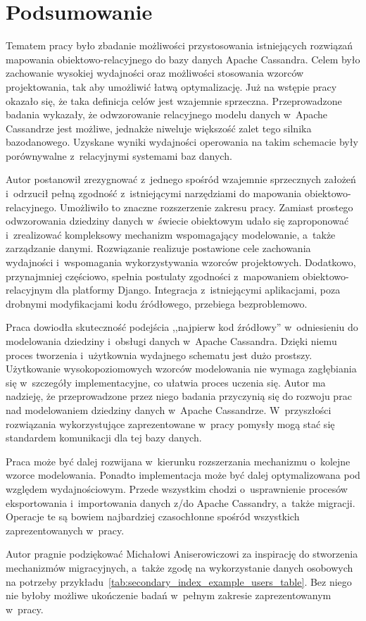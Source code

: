 
\chapter{Podsumowanie}
\label{chap:summary}

Tematem pracy było zbadanie możliwości przystosowania istniejących rozwiązań mapowania obiektowo-relacyjnego do bazy danych Apache Cassandra. Celem było zachowanie wysokiej wydajności oraz możliwości stosowania wzorców projektowania, tak aby umożliwić łatwą optymalizację. Już na wstępie pracy okazało się, że taka definicja celów jest wzajemnie sprzeczna. Przeprowadzone badania wykazały, że odwzorowanie relacyjnego modelu danych w~Apache Cassandrze jest możliwe, jednakże niweluje większość zalet tego silnika bazodanowego. Uzyskane wyniki wydajności operowania na takim schemacie były porównywalne z~relacyjnymi systemami baz danych.

Autor postanowił zrezygnować z~jednego spośród wzajemnie sprzecznych założeń i~odrzucił pełną zgodność z~istniejącymi narzędziami do mapowania obiektowo-relacyjnego. Umożliwiło to znaczne rozszerzenie zakresu pracy. Zamiast prostego odwzorowania dziedziny danych w~świecie obiektowym udało się zaproponować i~zrealizować kompleksowy mechanizm wspomagający modelowanie, a~także zarządzanie danymi. Rozwiązanie realizuje postawione cele zachowania wydajności i~wspomagania wykorzystywania wzorców projektowych. Dodatkowo, przynajmniej częściowo, spełnia postulaty zgodności z~mapowaniem obiektowo-relacyjnym dla platformy Django. Integracja z~istniejącymi aplikacjami, poza drobnymi modyfikacjami kodu źródłowego, przebiega bezproblemowo.

Praca dowiodła skuteczność podejścia ,,najpierw kod źródłowy'' w~odniesieniu do modelowania dziedziny i~obsługi danych w~Apache Cassandra. Dzięki niemu proces tworzenia i~użytkownia wydajnego schematu jest dużo prostszy. Użytkowanie wysokopoziomowych wzorców modelowania nie wymaga zagłębiania się w~szczegóły implementacyjne, co ułatwia proces uczenia się. Autor ma nadzieję, że przeprowadzone przez niego badania przyczynią się do rozwoju prac nad modelowaniem dziedziny danych w~Apache Cassandrze. W~przyszłości rozwiązania wykorzystujące zaprezentowane w~pracy pomysły mogą stać się standardem komunikacji dla tej bazy danych.

Praca może być dalej rozwijana w~kierunku rozszerzania mechanizmu o~kolejne wzorce modelowania. Ponadto implementacja może być dalej optymalizowana pod względem wydajnościowym. Przede wszystkim chodzi o~usprawnienie procesów eksportowania i~importowania danych z/do Apache Cassandry, a~także migracji. Operacje te są bowiem najbardziej czasochłonne spośród wszystkich zaprezentowanych w~pracy.

Autor pragnie podziękować Michałowi Aniserowiczowi za inspirację do stworzenia mechanizmów migracyjnych, a~także zgodę na wykorzystanie danych osobowych na potrzeby przykładu~\ref{tab:secondary_index_example_users_table}. Bez niego nie byłoby możliwe ukończenie badań w~pełnym zakresie zaprezentowanym w~pracy.
